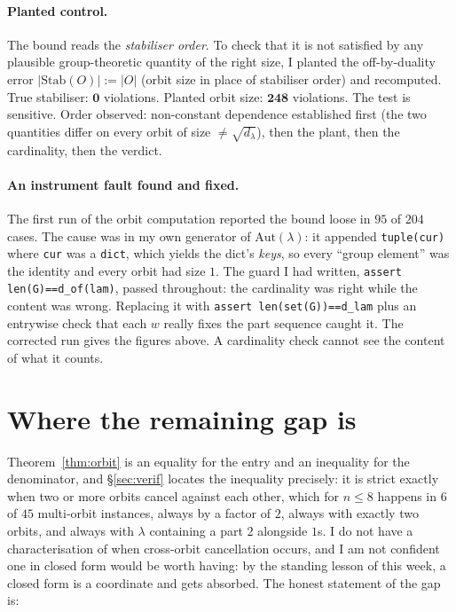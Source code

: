 \documentclass[11pt]{article}
\theoremstyle{definition}
\newcommand{\lam}{\lambda}
\newcommand{\Stab}{\mathrm{Stab}}
\newcommand{\Aut}{\mathrm{Aut}}
\begin{document}
\paragraph{Planted control.} The bound reads the \emph{stabiliser order}. To check that it is not
satisfied by any plausible group-theoretic quantity of the right size, I planted the off-by-duality
error $|\Stab(O)|:=|O|$ (orbit size in place of stabiliser order) and recomputed. True stabiliser:
$\mathbf{0}$ violations. Planted orbit size: $\mathbf{248}$ violations. The test is sensitive. Order
observed: non-constant dependence established first (the two quantities differ on every orbit of size
$\ne\sqrt{d_\lam}$), then the plant, then the cardinality, then the verdict.

\paragraph{An instrument fault found and fixed.} The first run of the orbit computation reported the
bound loose in $95$ of $204$ cases. The cause was in my own generator of $\Aut(\lam)$: it appended
\verb|tuple(cur)| where \verb|cur| was a \texttt{dict}, which yields the dict's \emph{keys}, so every
``group element'' was the identity and every orbit had size $1$. The guard I had written,
\verb|assert len(G)==d_of(lam)|, passed throughout: the cardinality was right while the content was
wrong. Replacing it with \verb|assert len(set(G))==d_lam| plus an entrywise check that each $w$
really fixes the part sequence caught it. The corrected run gives the figures above. A cardinality
check cannot see the content of what it counts.

\section{Where the remaining gap is}

Theorem~\ref{thm:orbit} is an equality for the entry and an inequality for the denominator, and
\S\ref{sec:verif} locates the inequality precisely: it is strict exactly when two or more orbits
cancel against each other, which for $n\le8$ happens in $6$ of $45$ multi-orbit instances, always by
a factor of $2$, always with exactly two orbits, and always with $\lam$ containing a part $2$
alongside $1$s. I do not have a characterisation of when cross-orbit cancellation occurs, and I am
not confident one in closed form would be worth having: by the standing lesson of this week, a closed
form is a coordinate and gets absorbed. The honest statement of the gap is:
\end{document}

